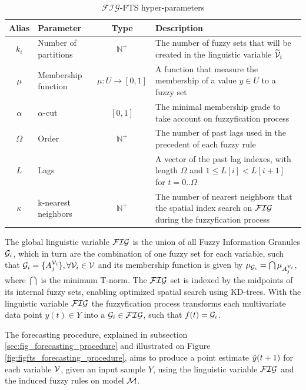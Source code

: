 \begin{table}[]
    \centering
    \begin{tabular}{|c|m{2cm}|c|m{}|} \hline
        \textbf{Alias} & \textbf{Parameter} & \textbf{Type} & \textbf{Description}  \\ \hline
         $k_i$ & Number of partitions & $\mathbb{N}^+$ & The number of fuzzy sets that will be created in the linguistic variable $\widetilde{\mathcal{V}}_i$  \\ \hline
         $\mu$ & Membership function & $\mu: U \rightarrow [0,1] $ & A function that measure the membership of a value $y \in U$ to a fuzzy set  \\\hline
         $\alpha$ & $\alpha$-cut & $[0,1]$ & The minimal membership grade to take account on fuzzyfication process \\ \hline
         $\Omega$ & Order & $\mathbb{N}^+$ & The number of past lags used in the precedent of each fuzzy rule \\\hline
         $L$ & Lags & & A vector of the past lag indexes, with length $\Omega$ and $1 \leq L[i] < L[i+1]$ for  $t=0..\Omega$ \\ \hline
         $\kappa$ & k-nearest neighbors & $\mathbb{N}^+$ & The number of nearest neighbors that the spatial index search on $\mathcal{FIG}$ during the fuzzyfication process \\ \hline
    \end{tabular}
    \caption{$\mathcal{FIG}$-FTS hyper-parameters}
    \label{tab:fig_hyperparameters}
\end{table}

The global linguistic variable $\mathcal{FIG}$ is the union of all Fuzzy Information Granules $\mathcal{G}_i$, which in turn are the combination of one fuzzy set for each variable, such that $\mathcal{G}_i = \{ A_j^{\mathcal{V}_i} \}, \forall \mathcal{V}_i \in \mathcal{V}$ and its membership function is given by $\mu_{\mathcal{G}_i} = \bigcap \mu_{A_j^{\mathcal{V}_i}}$, where $\bigcap$ is the minimum T-norm. The $\mathcal{FIG}$ set is indexed by the midpoints of its internal fuzzy sets, enabling optimized spatial search using KD-trees.  
With the linguistic variable $\mathcal{FIG}$ the fuzzyfication process transforms each multivariate data point $y(t) \in Y$ into a  $\mathcal{G}_i \in \mathcal{FIG}$, such that $f(t) = \mathcal{G}_i$.

The forecasting procedure, explained in subsection \ref{sec:fig_forecasting_procedure} and illustrated on Figure \ref{fig:figfts_forecasting_procedure}, aims to produce a point estimate $\hat{y}(t+1)$ for each variable $\mathcal{V}$, given an input sample $Y$, using the linguistic variable $\mathcal{FIG}$ and the induced fuzzy rules on model $\mathcal{M}$.

